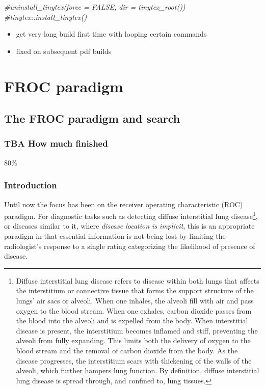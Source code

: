 \documentclass[
]{book}
\newenvironment{Shaded}{\begin{snugshade}}{\end{snugshade}}
\newcommand{\CommentTok}[1]{\textcolor[rgb]{0.56,0.35,0.01}{\textit{#1}}}
\providecommand{\tightlist}{%
  \setlength{\itemsep}{0pt}\setlength{\parskip}{0pt}}
\begin{document}
\begin{Shaded}
\begin{Highlighting}[]
\CommentTok{#uninstall_tinytex(force = FALSE, dir = tinytex_root())}
\CommentTok{#tinytex::install_tinytex()}
\end{Highlighting}
\end{Shaded}

\begin{itemize}
\tightlist
\item
  get very long build first time with looping certain commands
\item
  fixed on subsequent pdf builds
\end{itemize}

\hypertarget{part-froc-paradigm}{%
\part*{FROC paradigm}\label{part-froc-paradigm}}

\hypertarget{froc-paradigm}{%
\chapter{The FROC paradigm and search}\label{froc-paradigm}}

\hypertarget{froc-paradigm-how-much-finished}{%
\section{TBA How much finished}\label{froc-paradigm-how-much-finished}}

80\%

\hypertarget{froc-paradigm-intro}{%
\section{Introduction}\label{froc-paradigm-intro}}

Until now the focus has been on the receiver operating characteristic (ROC) paradigm. For diagnostic tasks such as detecting diffuse interstitial lung disease\footnote{Diffuse interstitial lung disease refers to disease within both lungs that affects the interstitium or connective tissue that forms the support structure of the lungs' air sacs or alveoli. When one inhales, the alveoli fill with air and pass oxygen to the blood stream. When one exhales, carbon dioxide passes from the blood into the alveoli and is expelled from the body. When interstitial disease is present, the interstitium becomes inflamed and stiff, preventing the alveoli from fully expanding. This limits both the delivery of oxygen to the blood stream and the removal of carbon dioxide from the body. As the disease progresses, the interstitium scars with thickening of the walls of the alveoli, which further hampers lung function. By definition, diffuse interstitial lung disease is spread through, and confined to, lung tissues.}, or diseases similar to it, where \emph{disease location is implicit}, this is an appropriate paradigm in that essential information is not being lost by limiting the radiologist's response to a single rating categorizing the likelihood of presence of disease.
\end{document}
